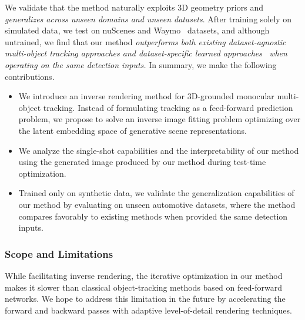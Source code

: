 We validate that the method naturally exploits 3D geometry priors and \emph{generalizes across unseen domains and unseen datasets}. After training solely on simulated data, we test on nuScenes \cite{caesar2020nuscenes} and Waymo~\cite{sun2020scalability} datasets, and although untrained, we find that our method \emph{outperforms both existing dataset-agnostic multi-object tracking approaches and dataset-specific learned approaches~\cite{zhou2020CenterTrack} when operating on the same detection inputs.}
In summary, we make the following contributions. 
\begin{itemize}
    \item We introduce an inverse rendering method for 3D-grounded monocular multi-object tracking. Instead of formulating tracking as a feed-forward prediction problem, we propose to solve an inverse image fitting problem optimizing over the latent embedding space of generative scene representations.
    \item We analyze the single-shot capabilities and the interpretability of our method using the generated image produced by our method during test-time optimization.
    \item  Trained only on synthetic data, we validate the generalization capabilities of our method by evaluating on unseen automotive datasets, where the method compares favorably to existing methods when provided the same detection inputs.
\end{itemize}

\subsubsection{Scope and Limitations} While facilitating inverse rendering, the iterative optimization in our method makes it slower than classical object-tracking methods based on feed-forward networks. We hope to address this limitation in the future by accelerating the forward and backward passes with adaptive level-of-detail rendering techniques.

